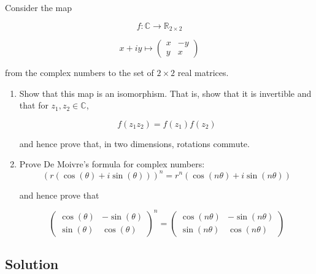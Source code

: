 \documentclass[12pt]{article}
\begin{document}
Consider the map

\begin{equation}
    f: \mathbb{C} \rightarrow \mathbb{R}_{2 \times 2}
\end{equation}

\[
    x + iy \mapsto
    \begin{pmatrix}
        x & -y \\
        y & x
    \end{pmatrix}
\]

from the complex numbers to the set of $2 \times 2$ real matrices.

\renewcommand{\labelenumi}{(\alph{enumi})}
\begin{enumerate}
    \item Show that this map is an isomorphism. That is, show that it is invertible and that for $z_{1}, z_{2} \in \mathbb{C}$,

          \begin{equation}
              f\left(z_{1} z_{2}\right)=f\left(z_{1}\right) f\left(z_{2}\right)
          \end{equation}

          and hence prove that, in two dimensions, rotations commute.
    \item Prove De Moivre's formula for complex numbers:
          \begin{equation}
              {(r(\cos (\theta)+i \sin (\theta)))}^{n}=r^{n}(\cos (n \theta)+i \sin (n \theta))
          \end{equation}

          and hence prove that

          \begin{equation}
              {\left(\begin{array}{cc}
                          \cos (\theta) & -\sin (\theta) \\
                          \sin (\theta) & \cos (\theta)
                      \end{array}\right)}^{n}=\left(\begin{array}{cc}
                      \cos (n \theta) & -\sin (n \theta) \\
                      \sin (n \theta) & \cos (n \theta)
                  \end{array}\right)
          \end{equation}
\end{enumerate}

\subsection{Solution}
\end{document}

